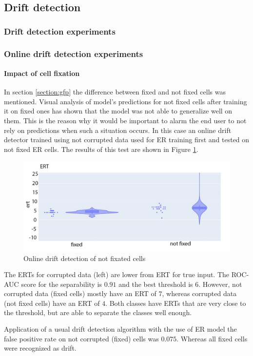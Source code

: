 \subsection{Drift detection}
    
    \subsubsection{Drift detection experiments}
        
    \subsubsection{Online drift detection experiments}
            
            \paragraph{Impact of cell fixation}
                In section \ref{section:gfp} the difference between fixed and not fixed cells was mentioned. Visual analysis of model's predictions for not fixed cells after training it on fixed ones has shown that the model was not able to generalize well on them. This is the reason why it would be important to alarm the end user to not rely on predictions when such a situation occurs. In this case an online drift detector trained using not corrupted data used for ER training first and tested on not fixed ER cells. The results of this test are shown in Figure \ref{fig:online-drift-not-fixed}.
                \begin{figure}[htb]
                    \begin{center}
                        \includegraphics[width=0.5\linewidth]{bilder/drift-detection/online-fixed-vs-not-fixed.png}
                        \caption{Online drift detection of not fixated cells}\label{fig:online-drift-not-fixed}
                    \end{center}
                \end{figure}
                The ERTs for corrupted data (left) are lower from ERT for true input. The ROC-AUC score for the separability is $0.91$ and the best threshold is $6$. However, not corrupted data (fixed cells) mostly have an ERT of $7$, whereas corrupted data (not fixed cells) have an ERT of $4$. Both classes have ERTs that are very close to the threshold, but are able to separate the classes well enough.

                Application of a usual drift detection algorithm with the use of ER model the false positive rate on not corrupted (fixed) cells was $0.075$. Whereas all fixed cells were recognized as drift.  